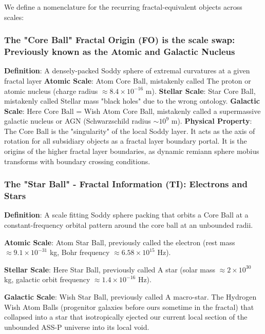 \documentclass[11pt,a4paper]{article}
\begin{document}
    We define a nomenclature for the recurring fractal-equivalent objects across scales:


    \subsubsection{The "Core Ball" Fractal Origin (FO) is the scale swap: 
    Previously known as the Atomic and Galactic Nucleus
    }
    \noindent\textbf{Definition}: A densely-packed Soddy sphere of extremal curvatures at a given fractal layer 
    \noindent\textbf{Atomic Scale}: Atom Core Ball, mistakenly called The proton or atomic nucleus (charge radius $\approx 8.4 \times 10^{-16}$ m).
    \noindent\textbf{Stellar Scale}: Star Core Ball, mistakenly called Stellar mass "black holes" due to the wrong ontology.
    \noindent\textbf{Galactic Scale}: Here Core Ball = Wish Atom Core Ball, mistakenly called a supermassive galactic nucleus or AGN (Schwarzschild radius $\sim 10^9$ m).
    \noindent\textbf{Physical Property}: The Core Ball is the "singularity" of the local Soddy layer. It acts as the axis of rotation for all subsidiary objects as a fractal layer boundary portal. It is the origins of the higher fractal layer boundaries, as dynamic remiann sphere mobius transforms with boundary crossing conditions.


    \subsubsection{The "Star Ball" - Fractal Information (TI): Electrons and Stars}

    \noindent\textbf{Definition}: A scale fitting Soddy sphere packing that orbits a Core Ball at a constant-frequency orbital pattern around the core ball at an unbounded radii.

    \noindent\textbf{Atomic Scale}: Atom Star Ball, previously called the electron (rest mass $\approx 9.1 \times 10^{-31}$ kg, Bohr frequency $\approx 6.58 \times 10^{15}$ Hz).

    \noindent\textbf{Stellar Scale}: Here Star Ball, previously called A star (solar mass $\approx 2 \times 10^{30}$ kg, galactic orbit frequency $\approx 1.4 \times 10^{-16}$ Hz).

    \noindent\textbf{Galactic Scale}: Wish Star Ball, previously called A macro-star. The Hydrogen Wish Atom Balls (progenitor galaxies before ours sometime in the fractal) that collapsed into a star that isotropically ejected our current local section of the unbounded ASS-P universe into its local void. 
\end{document}
